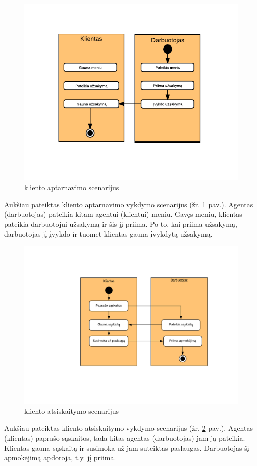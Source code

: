 \documentclass{VUMIFPSkursinis}
\begin{document}
	\begin {figure}[H]
	\centering
		\caption{kliento aptarnavimo scenarijus}
		\includegraphics[scale=1]{img/3lab/Diagrama4}
		
		\label{fig:diagrama4}
	\end{figure}
Aukšiau pateiktas kliento aptarnavimo vykdymo scenarijus (žr. \ref{fig:diagrama4} pav.). 
Agentas (darbuotojas) pateikia kitam agentui (klientui) meniu. Gavęs meniu, klientas pateikia 
darbuotojui užsakymą ir šis jį priima. Po to, kai priima užsakymą, darbuotojas jį įvykdo ir tuomet klientas gauna įvykdytą užsakymą. \\

	\begin {figure}[H]
	\centering
		\caption{kliento atsiskaitymo scenarijus}
		\includegraphics[scale=1]{img/3lab/Diagrama5}
		
		\label{fig:diagrama5}
	\end{figure}
Aukšiau pateiktas kliento atsiskaitymo vykdymo scenarijus (žr. \ref{fig:diagrama5} pav.).
Agentas (klientas) paprašo sąskaitos, tada kitas agentas (darbuotojas) jam ją pateikia. Klientas gauna sąskaitą ir susimoka už jam suteiktas paslaugas. Darbuotojas šį apmokėjimą apdoroja, t.y. jį priima.
\end{document}
